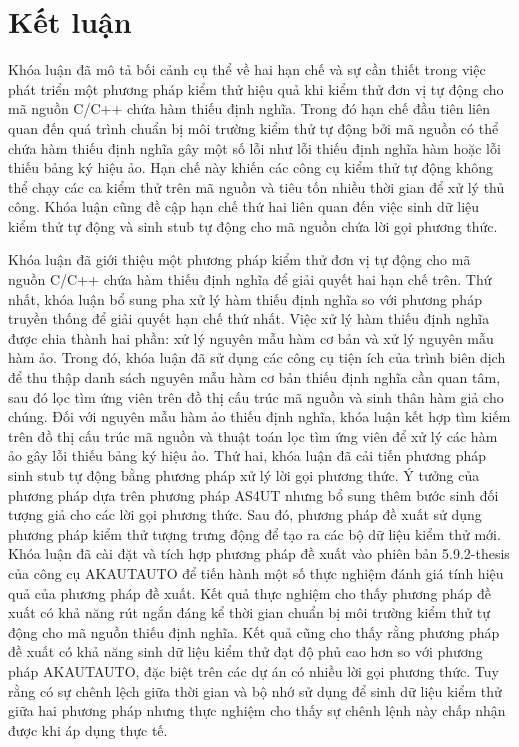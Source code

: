 \chapter*{Kết luận}\label{chap5}
Khóa luận đã mô tả bối cảnh cụ thể về hai hạn chế và sự cần thiết trong việc phát triển một phương pháp kiểm thử hiệu quả khi kiểm thử đơn vị tự động cho mã nguồn C/C++ chứa hàm thiếu định nghĩa. Trong đó hạn chế đầu tiên liên quan đến quá trình chuẩn bị môi trường kiểm thử tự động bởi mã nguồn có thể chứa hàm thiếu định nghĩa gây một số lỗi như lỗi thiếu định nghĩa hàm hoặc lỗi thiếu bảng ký hiệu ảo. Hạn chế này khiến các công cụ kiểm thử tự động không thể chạy các ca kiểm thử trên mã nguồn và tiêu tốn nhiều thời gian để xử lý thủ công. Khóa luận cũng đề cập hạn chế thứ hai liên quan đến việc sinh dữ liệu kiểm thử tự động và sinh stub tự động cho mã nguồn chứa lời gọi phương thức. 

Khóa luận đã giới thiệu một phương pháp kiểm thử đơn vị tự động cho mã nguồn C/C++ chứa hàm thiếu định nghĩa để giải quyết hai hạn chế trên. Thứ nhất, khóa luận bổ sung pha xử lý hàm thiếu định nghĩa so với phương pháp truyền thống để giải quyết hạn chế thứ nhất. Việc xử lý hàm thiếu định nghĩa được chia thành hai phần: xử lý nguyên mẫu hàm cơ bản và xử lý nguyên mẫu hàm ảo. Trong đó, khóa luận đã sử dụng các công cụ tiện ích của trình biên dịch để thu thập danh sách nguyên mẫu hàm cơ bản thiếu định nghĩa cần quan tâm, sau đó lọc tìm ứng viên trên đồ thị cấu trúc mã nguồn và sinh thân hàm giả cho chúng. Đối với nguyên mẫu hàm ảo thiếu định nghĩa, khóa luận kết hợp tìm kiếm trên đồ thị cấu trúc mã nguồn và thuật toán lọc tìm ứng viên để xử lý các hàm ảo gây lỗi thiếu bảng ký hiệu ảo. Thứ hai, khóa luận đã cải tiến phương pháp sinh stub tự động bằng phương pháp xử lý lời gọi phương thức. Ý tưởng của phương pháp dựa trên phương pháp AS4UT nhưng bổ sung thêm bước sinh đối tượng giả cho các lời gọi phương thức. Sau đó, phương pháp đề xuất sử dụng phương pháp kiểm thử tượng trưng động để tạo ra các bộ dữ liệu kiểm thử mới.\\

Khóa luận đã cài đặt và tích hợp phương pháp đề xuất vào phiên bản 5.9.2-thesis của công cụ AKAUTAUTO để tiến hành một số thực nghiệm đánh giá tính hiệu quả của phương pháp đề xuất. Kết quả thực nghiệm cho thấy phương pháp đề xuất có khả năng rút ngắn đáng kể thời gian chuẩn bị môi trường kiểm thử tự động cho mã nguồn thiếu định nghĩa. Kết quả cũng cho thấy rằng phương pháp đề xuất có khả năng sinh dữ liệu kiểm thử đạt độ phủ cao hơn so với phương pháp AKAUTAUTO, đặc biệt trên các dự án có nhiều lời gọi phương thức. Tuy rằng có sự chênh lệch giữa thời gian và bộ nhớ sử dụng để sinh dữ liệu kiểm thử giữa hai phương pháp nhưng thực nghiệm cho thấy sự chênh lệnh này chấp nhận được khi áp dụng thực tế. 

